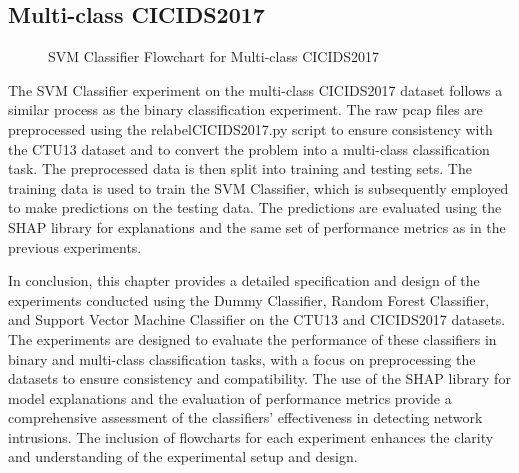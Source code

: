 \subsection{Multi-class CICIDS2017}
\begin{figure}[H]
\centering
{}
\caption{SVM Classifier Flowchart for Multi-class CICIDS2017}\label{fig:SVMFlowMultiCICIDS2017}
\end{figure}

The SVM Classifier experiment on the multi-class CICIDS2017 dataset follows a similar process as the binary classification experiment. The raw pcap files are preprocessed using the relabelCICIDS2017.py script to ensure consistency with the CTU13 dataset and to convert the problem into a multi-class classification task. The preprocessed data is then split into training and testing sets. The training data is used to train the SVM Classifier, which is subsequently employed to make predictions on the testing data. The predictions are evaluated using the SHAP library for explanations and the same set of performance metrics as in the previous experiments.

In conclusion, this chapter provides a detailed specification and design of the experiments conducted using the Dummy Classifier, Random Forest Classifier, and Support Vector Machine Classifier on the CTU13 and CICIDS2017 datasets. The experiments are designed to evaluate the performance of these classifiers in binary and multi-class classification tasks, with a focus on preprocessing the datasets to ensure consistency and compatibility. The use of the SHAP library for model explanations and the evaluation of performance metrics provide a comprehensive assessment of the classifiers' effectiveness in detecting network intrusions. The inclusion of flowcharts for each experiment enhances the clarity and understanding of the experimental setup and design.